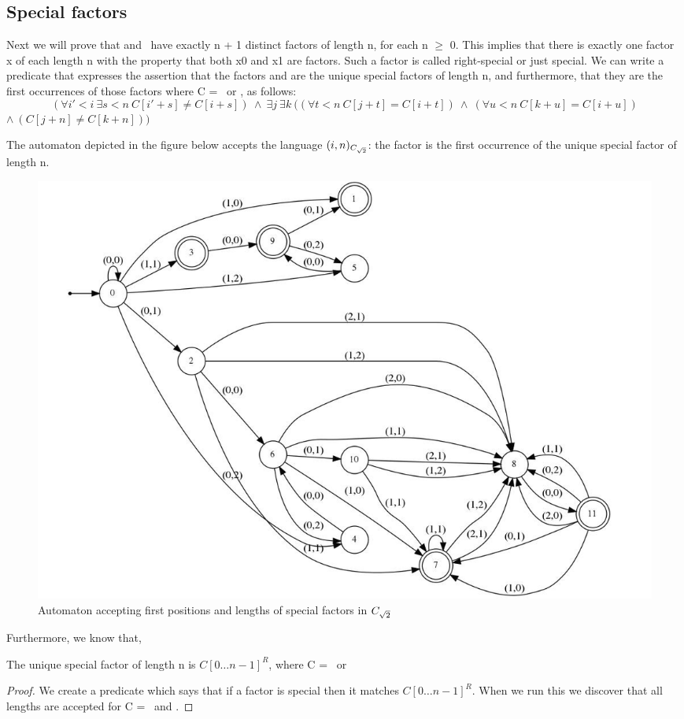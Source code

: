 \subsection{Special factors}
Next we will prove that \Ctwo and \Cthree \ have exactly n + 1 distinct factors of length n, for each n $\geq$ 0.  This implies that there is exactly one factor x of each length n with the property that both x0 and x1 are factors. Such a factor is called right-special or just special.  We can write a predicate that expresses the assertion that the factors \Ctwo[i..i+n-1] and \Cthree[i\ldots i+n-1] are the unique special factors of length n, and furthermore, that they are the first occurrences of those factors where C = \Ctwo \ or \Cthree, as follows: \\
\begin{equation*}
    (\forall i'< i\ \exists s < n\ C[i'+s] \ne C[i+s])\ \wedge\ \exists j\ \exists k\ ((\forall t < n\ C[j+t] = C[i+t])\ \wedge\ (\forall u < n\ C[k+u]=C[i+u])  
\end{equation*} 
$\wedge\ (C[j+n] \ne C[k+n]))$ \\

\begin{theorem}
The automaton depicted in the figure below accepts the language {$(i,n)_{C_{\sqrt{2}}}$: the factor \Ctwo[i\ldots i+n-1] is the first occurrence of the unique special factor of length n}.
\end{theorem}

\begin{figure}[h]
    \centering
    \includegraphics[width=\textwidth]{sturmian_word_paper/paper_images/rt2theorem17.png}
    \caption{Automaton accepting first positions and lengths of special factors in $C_{\sqrt{2}}$}
\end{figure} 
Furthermore, we know that,
\begin{theorem}
The unique special factor of length n is $C[0\ldots n-1]^{R}$, where C = \Ctwo\ or \Cthree
\end{theorem}
\begin{proof}
We create a predicate which says that if a factor is special then it matches $C[0\ldots n-1]^{R}$. When we run this we discover that all lengths are accepted for C = \Ctwo\ and \Cthree.
\end{proof}
